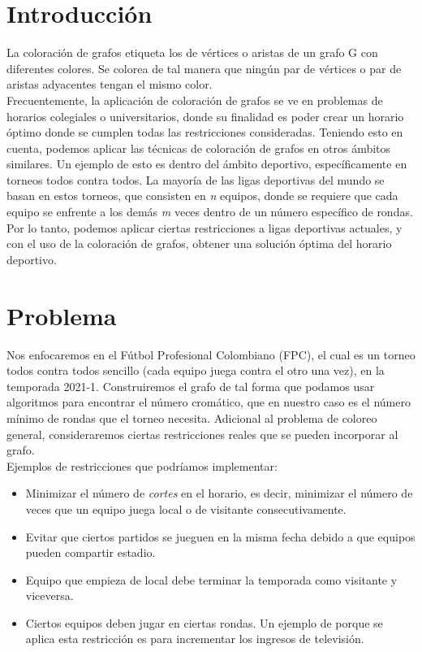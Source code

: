 \documentclass[11pt]{article}
\begin{document}
    \begin{multicols}{2}
    \setcounter{page}{1}

        \section{Introducción}
            La coloración de grafos etiqueta los de vértices o aristas de un grafo G con diferentes colores. 
            Se colorea de tal manera que ningún par de vértices o par de aristas adyacentes tengan el mismo color.\\
            Frecuentemente, la aplicación de coloración de grafos se ve en problemas de horarios colegiales o 
            universitarios, donde su finalidad es poder crear un horario óptimo donde se cumplen todas las restricciones consideradas. 
            Teniendo esto en cuenta, podemos aplicar las técnicas de coloración de grafos en otros ámbitos similares. 
            Un ejemplo de esto es dentro del ámbito deportivo, específicamente en torneos todos contra todos. La mayoría de las 
            ligas deportivas del mundo se basan en estos torneos, que consisten en \textit{n} equipos, donde se requiere que cada equipo se 
            enfrente a los demás \textit{m} veces dentro de un número específico de rondas. Por lo tanto, podemos aplicar ciertas 
            restricciones a ligas deportivas actuales, y con el uso de la coloración de grafos, obtener una solución óptima 
            del horario deportivo. 

        \section{Problema}
            Nos enfocaremos en el Fútbol Profesional Colombiano (FPC), el cual es un torneo todos contra todos sencillo 
            (cada equipo juega contra el otro una vez), en la temporada 2021-1. Construiremos el grafo de tal forma que podamos 
            usar algoritmos para encontrar el número cromático, que en nuestro caso es el número mínimo de rondas que el torneo necesita.
            Adicional al problema de coloreo general, consideraremos ciertas restricciones reales que se pueden incorporar al grafo.\\[10pt]
            Ejemplos de restricciones que podríamos implementar:

            \begin{itemize}
                \item Minimizar el número de \textit{cortes} en el horario, es decir, minimizar el número de veces que un equipo juega local o de visitante consecutivamente.
                \item Evitar que ciertos partidos se jueguen en la misma fecha debido a que equipos pueden compartir estadio.
                \item Equipo que empieza de local debe terminar la temporada como visitante y viceversa.
                \item Ciertos equipos deben jugar en ciertas rondas. Un ejemplo de porque se aplica esta restricción es para incrementar los ingresos de televisión.
            \end{itemize}
   

\end{multicols}
\end{document}
